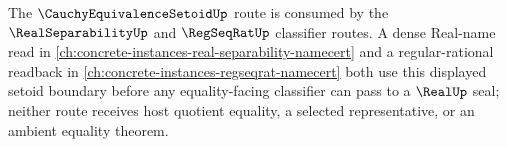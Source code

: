 \noindent
The $\CauchyEquivalenceSetoidUp$ route is consumed by the $\RealSeparabilityUp$ and $\RegSeqRatUp$ classifier routes. A dense Real-name read in \autoref{ch:concrete-instances-real-separability-namecert} and a regular-rational readback in \autoref{ch:concrete-instances-regseqrat-namecert} both use this displayed setoid boundary before any equality-facing classifier can pass to a $\RealUp$ seal; neither route receives host quotient equality, a selected representative, or an ambient equality theorem.
